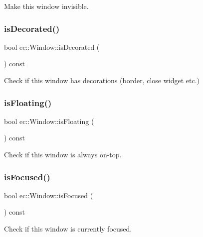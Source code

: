 Make this window invisible. \mbox{\label{classec_1_1_window_a2761ae9079a18f5d62b2ed4715fd9bd1}} 
\subsubsection{\texorpdfstring{is\+Decorated()}{isDecorated()}}
{\footnotesize\ttfamily bool ec\+::\+Window\+::is\+Decorated (\begin{DoxyParamCaption}{ }\end{DoxyParamCaption}) const}

Check if this window has decorations (border, close widget etc.) \mbox{\label{classec_1_1_window_a8e0c04a4c922d351246af64a5d439ba3}} 
\subsubsection{\texorpdfstring{is\+Floating()}{isFloating()}}
{\footnotesize\ttfamily bool ec\+::\+Window\+::is\+Floating (\begin{DoxyParamCaption}{ }\end{DoxyParamCaption}) const}

Check if this window is always on-\/top. \mbox{\label{classec_1_1_window_ac40c6391e9edd720407f8a77d4ee546a}} 
\subsubsection{\texorpdfstring{is\+Focused()}{isFocused()}}
{\footnotesize\ttfamily bool ec\+::\+Window\+::is\+Focused (\begin{DoxyParamCaption}{ }\end{DoxyParamCaption}) const}

Check if this window is currently focused. \mbox{\label{classec_1_1_window_aa4a8cfb938d1a28864e8d0cc265dd96e}} 
